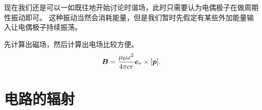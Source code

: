 现在我们还是可以一如既往地开始讨论时谐场，此时只需要认为电偶极子在做周期性振动即可。
这种振动当然会消耗能量，但是我们暂时先假定有某些外加能量输入让电偶极子持续振荡。

先计算出磁场，然后计算出电场比较方便。
\begin{equation}
    \vb*{B} = \frac{\mu_0 \omega^2}{4\pi c r} \vb*{e}_r \times [\vb*{p}].
\end{equation}

\section{电路的辐射}
